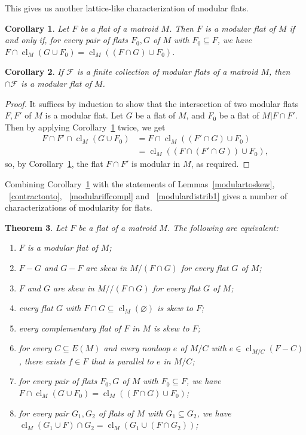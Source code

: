 \documentclass{amsart}
\theoremstyle{plain}
\newtheorem{theorem}{Theorem}[section]
\newtheorem{corollary}[theorem]{Corollary}
\theoremstyle{definition}
\newcommand{\cF}{\mathcal{F}}
\newcommand{\dcon}{/ \!\! /}
\DeclareMathOperator{\cl}{cl}
\newcommand{\con}{/}
\newcommand{\br}[1]{\left(#1\right)}
\newcommand{\es}{\varnothing}
\renewcommand{\ss}{\subseteq}
\begin{document}
This gives us another lattice-like characterization of modular flats. 

\begin{corollary}\label{modulardistrib2}
  Let $F$ be a flat of a matroid $M$. Then $F$ is a modular flat of $M$ if and only if, 
  for every pair of flats $F_0, G$ of $M$ with $F_0 \ss F$, we have $F \cap \cl_M(G \cup F_0) = \cl_M((F \cap G) \cup F_0)$. 
\end{corollary}


\begin{corollary}\label{modularfiniteinter}
  If $\cF$ is a finite collection of modular flats of a matroid $M$, then $\cap \cF$ 
  is a modular flat of $M$. 
\end{corollary}
\begin{proof}
It suffices by induction 
    to show that the intersection of two modular flats $F,F'$ of $M$ is a modular flat.
    Let $G$ be a flat of $M$, and $F_0$ be a flat of $M | F \cap F'$. 
    Then by applying Corollary~\ref{modulardistrib2} twice, we get
    \begin{align*}
        F \cap F' \cap \cl_M(G \cup F_0) &= F \cap \cl_M((F' \cap G) \cup F_0) \\ 
        &= \cl_M\br{(F \cap (F' \cap G)) \cup F_0},
    \end{align*}
    so, by Corollary~\ref{modulardistrib2}, the flat $F \cap F'$ is modular in $M$, as required. 
\end{proof}

Combining Corollary~\ref{modulardistrib2} with the statements of 
Lemmas~\ref{modulartoskew}, ~\ref{contractonto}, ~\ref{modulariffcompl} and ~\ref{modulardistrib1} 
gives a number of characterizations of modularity for flats. 

\begin{theorem}\label{modequiv}
  Let $F$ be a flat of a matroid $M$. The following are equivalent: 
  \begin{enumerate}[(1)]
    \item $F$ is a modular flat of $M$;
    \item $F-G$ and $G-F$ are skew in $M \con (F \cap G)$ for every flat $G$ of $M$;
    \item $F$ and $G$ are skew in $M \dcon (F \cap G)$ for every flat $G$ of $M$;
    \item every flat $G$ with $F \cap G \ss \cl_M(\es)$ is skew to $F$;
    \item every complementary flat of $F$ in $M$ is skew to $F$;
    \item
    for every $C \subseteq E(M)$ and every nonloop $e$ of $M \con C$ with $e \in \cl_{M \con C}(F-C)$, 
    there exists $f \in F$ that is parallel to $e$ in $M \con C$;
    \item 
    for every pair of flats $F_0, G$ of $M$ with $F_0 \ss F$, we have $F \cap \cl_M(G \cup F_0) = \cl_M((F \cap G) \cup F_0)$;
    \item 
    for every pair $G_1,G_2$
    of flats of $M$ with $G_1 \ss G_2$, we have $\cl_M(G_1 \cup F) \cap G_2 = \cl_M(G_1 \cup (F \cap G_2))$;
  \end{enumerate}
\end{theorem}
\end{document}
